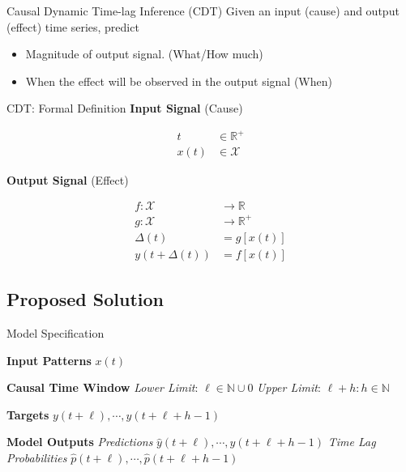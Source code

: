 \documentclass{beamer}
\begin{document}
\begin{frame}{Causal Dynamic Time-lag Inference (CDT)}
  Given an input (cause) and output (effect) time series, predict 
  \begin{itemize}
  \item {
      Magnitude of output signal. (What/How much)
  }
  \item {
      When the effect will be observed in the output signal (When)
  }
  \end{itemize}
\end{frame}

\begin{frame}{CDT: Formal Definition}
\textbf{Input Signal} (Cause)

\begin{align*}
t &\in \mathbb{R}^+\\
x(t) &\in \mathcal{X}
\end{align*}

\textbf{Output Signal} (Effect)

\begin{align*}
f: \mathcal{X} &\rightarrow \mathbb{R}\\
g: \mathcal{X} &\rightarrow \mathbb{R}^+\\
\Delta(t) &= g[x(t)] \\
y(t + \Delta(t)) &= f[x(t)] 
\end{align*}

\end{frame}

\subsection{Proposed Solution}

\begin{frame}{Model Specification}

\textbf{Input Patterns} $x(t)$ \newline

\textbf{Causal Time Window} \newline
\textit{Lower Limit}: $\ell \in \mathbb{N} \cup 0$ \newline
\textit{Upper Limit}: $\ell + h: h \in \mathbb{N}$ \newline

\textbf{Targets} $y(t+\ell), \cdots, y(t+\ell+h-1)$ \newline

\textbf{Model Outputs} \newline
\textit{Predictions} $\hat{y}(t+\ell), \cdots, \hat{y}(t+\ell+h-1)$ \newline
\textit{Time Lag Probabilities} $\hat{p}(t+\ell), \cdots, \hat{p}(t+\ell+h-1)$
    
\end{frame}
\end{document}
